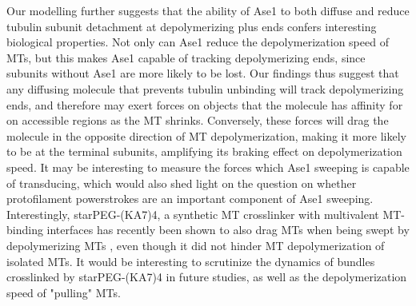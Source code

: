 Our modelling further suggests that the ability of Ase1 to both diffuse and reduce tubulin subunit detachment at depolymerizing plus ends confers interesting biological properties. Not only can Ase1 reduce the depolymerization speed of MTs, but this makes Ase1 capable of tracking depolymerizing ends, since subunits without Ase1 are more likely to be lost. Our findings thus suggest that any diffusing molecule that prevents tubulin unbinding will track depolymerizing ends, and therefore may exert forces on objects that the molecule has affinity for on accessible regions as the MT shrinks. Conversely, these forces will drag the molecule in the opposite direction of MT depolymerization, making it more likely to be at the terminal subunits, amplifying its braking effect on depolymerization speed. It may be interesting to measure the forces which Ase1 sweeping is capable of transducing, which would also shed light on the question on whether protofilament powerstrokes are an important component of Ase1 sweeping. Interestingly, starPEG-(KA7)4, a synthetic MT crosslinker with multivalent MT-binding interfaces has recently been shown to also drag MTs when being swept by depolymerizing MTs \parencite{Drechsler2019}, even though it did not hinder MT depolymerization of isolated MTs. It would be interesting to scrutinize the dynamics of bundles crosslinked by starPEG-(KA7)4 in future studies, as well as the depolymerization speed of "pulling" MTs. \par

